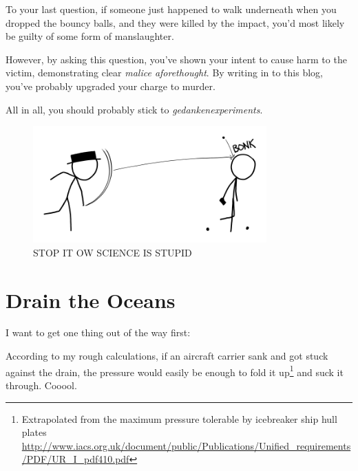 {{To your last question, if someone just happened to walk underneath when you dropped the bouncy balls, and they were killed by the impact, you'd most likely be guilty of some form of manslaughter.}

{However, by asking this question, you've shown your intent to cause harm to the victim, demonstrating clear \emph{malice aforethought}. By writing in to this blog, you've probably upgraded your charge to murder.}

{All in all, you should probably stick to \emph{gedankenexperiments}.}

\begin{figure}[!htbp]
\centering
\includegraphics[scale=0.5, max width=0.8\textwidth]{imgs/a/52/bouncy_thought4.png}
\caption{STOP IT OW SCIENCE IS STUPID}
\end{figure}

{
\chapter{Drain the Oceans}
}

\hfill{}

{I want to get one thing out of the way first:}

{According to my rough calculations, if an aircraft carrier sank and got stuck against the drain, the pressure would easily be enough to fold it up{\footnote{Extrapolated from the maximum pressure tolerable by icebreaker ship hull plates \href{http://www.iacs.org.uk/document/public/Publications/Unified\_requirements/PDF/UR\_I\_pdf410.pdf}{http://www.iacs.org.uk/document/public/Publications/Unified\_requirements/PDF/UR\_I\_pdf410.pdf}} } and suck it through. Cooool.}

}
